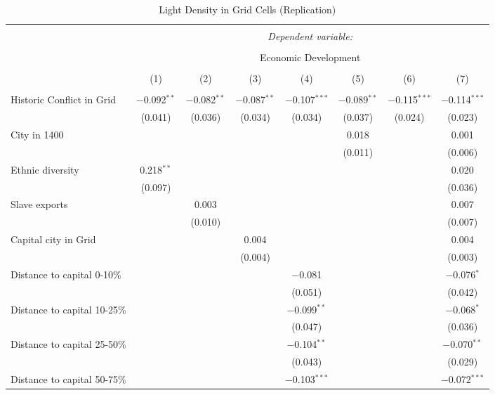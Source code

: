 
\begin{table}[!htbp] \centering 
  \caption{Light Density in Grid Cells (Replication)} 
  \label{} 
\footnotesize 
\begin{tabular}{@{\extracolsep{2pt}}lccccccc} 
\\[-1.8ex]\hline 
\hline \\[-1.8ex] 
 & \multicolumn{7}{c}{\textit{Dependent variable:}} \\ 
\cline{2-8} 
\\[-1.8ex] & \multicolumn{7}{c}{Economic Development} \\ 
\\[-1.8ex] & (1) & (2) & (3) & (4) & (5) & (6) & (7)\\ 
\hline \\[-1.8ex] 
 Historic Conflict in Grid & $-$0.092$^{**}$ & $-$0.082$^{**}$ & $-$0.087$^{**}$ & $-$0.107$^{***}$ & $-$0.089$^{**}$ & $-$0.115$^{***}$ & $-$0.114$^{***}$ \\ 
  & (0.041) & (0.036) & (0.034) & (0.034) & (0.037) & (0.024) & (0.023) \\ 
  City in 1400 &  &  &  &  & 0.018 &  & 0.001 \\ 
  &  &  &  &  & (0.011) &  & (0.006) \\ 
  Ethnic diversity & 0.218$^{**}$ &  &  &  &  &  & 0.020 \\ 
  & (0.097) &  &  &  &  &  & (0.036) \\ 
  Slave exports &  & 0.003 &  &  &  &  & 0.007 \\ 
  &  & (0.010) &  &  &  &  & (0.007) \\ 
  Capital city in Grid &  &  & 0.004 &  &  &  & 0.004 \\ 
  &  &  & (0.004) &  &  &  & (0.003) \\ 
  Distance to capital 0-10\% &  &  &  & $-$0.081 &  &  & $-$0.076$^{*}$ \\ 
  &  &  &  & (0.051) &  &  & (0.042) \\ 
  Distance to capital 10-25\% &  &  &  & $-$0.099$^{**}$ &  &  & $-$0.068$^{*}$ \\ 
  &  &  &  & (0.047) &  &  & (0.036) \\ 
  Distance to capital 25-50\% &  &  &  & $-$0.104$^{**}$ &  &  & $-$0.070$^{**}$ \\ 
  &  &  &  & (0.043) &  &  & (0.029) \\ 
  Distance to capital 50-75\% &  &  &  & $-$0.103$^{***}$ &  &  & $-$0.072$^{***}$ \\ 

\end{tabular}
\end{table}

